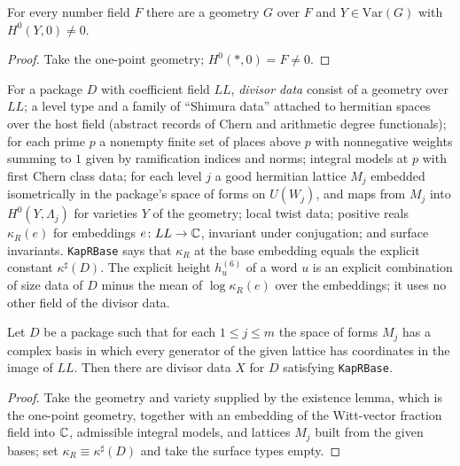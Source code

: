 \begin{lemma}\label{geoa:exists-geo}
For every number field $F$ there are a geometry $G$ over $F$ and $Y\in\mathrm{Var}(G)$ with
$H^0(Y,0)\ne0$.
\end{lemma}
\begin{proof}
Take the one-point geometry; $H^0(\ast,0)=F\ne0$.
\end{proof}

\begin{definition}\label{geoa:divx}
For a package $D$ with coefficient field $LL$, \emph{divisor data} consist of a geometry
over $LL$; a level type and a family of ``Shimura data'' attached to hermitian spaces over
the host field (abstract records of Chern and arithmetic degree functionals); for each
prime $p$ a nonempty finite set of places above $p$ with nonnegative weights summing to
$1$ given by ramification indices and norms; integral models at $p$ with first Chern
class data; for each level $j$ a good hermitian lattice $M_j$ embedded isometrically in the
package's space of forms on $U(W_j)$, and maps from $M_j$ into
$H^0(Y,\Lambda_j)$ for varieties $Y$ of the geometry; local twist data; positive reals
$\kappa_R(e)$ for embeddings $e\colon LL\to\mathbb{C}$, invariant under conjugation; and
surface invariants. \texttt{KapRBase} says that $\kappa_R$ at the base embedding equals
the explicit constant $\kappa^{\sharp}(D)$. The explicit height $h^{(6)}_u$ of a word $u$ is
an explicit combination of size data of $D$ minus the mean of $\log\kappa_R(e)$ over the
embeddings; it uses no other field of the divisor data.
\end{definition}

\begin{lemma}\label{geoa:provisional-divx}
Let $D$ be a package such that for each $1\le j\le m$ the space of forms $M_j$ has a
complex basis in which every generator of the given lattice has coordinates in the
image of $LL$. Then there are divisor data $X$ for $D$ satisfying \texttt{KapRBase}.
\end{lemma}
\begin{proof}
Take the geometry and variety supplied by the existence lemma, which is the one-point
geometry, together with an embedding of the Witt-vector fraction field into $\mathbb{C}$,
admissible integral models, and lattices $M_j$ built from the given bases; set
$\kappa_R\equiv\kappa^{\sharp}(D)$ and take the surface types empty.
\end{proof}

